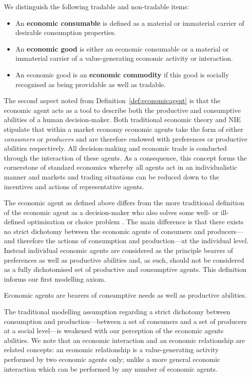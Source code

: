 \begin{definition} \label{economicgoods}
We distinguish the following tradable and non-tradable items:
\begin{itemize}
\item An \textbf{economic consumable} is defined as a material or immaterial carrier of desirable consumption properties.

\item An \textbf{economic good} is either an economic consumable or a material or immaterial carrier of a value-generating economic activity or interaction.

\item An economic good is an \textbf{economic commodity} if this good is socially recognised as being providable as well as tradable.
\end{itemize}
\end{definition}

The second aspect noted from Definition~\ref{def:economicagent} is that the economic agent acts as a tool to describe both the productive and consumptive abilities of a human decision-maker. Both traditional economic theory and NIE stipulate that within a market economy economic agents take the form of either \emph{consumers} or \emph{producers} and are therefore endowed with preferences or productive abilities respectively. All decision-making and economic trade is conducted through the interaction of these agents. As a consequence, this concept forms the cornerstone of standard economics whereby all agents act in an individualistic manner and markets and trading situations can be reduced down to the incentives and actions of representative agents.

The economic agent as defined above differs from the more traditional definition of the economic agent as a decision-maker who also solves some well- or ill-defined optimisation or choice problem \citep{MasColellWhinstonGreen1995}. The main difference is that there exists no strict dichotomy between the economic agents of consumers and producers---and therefore the actions of consumption and production---at the individual level. Instead individual economic agents are considered as the principle bearers of preferences as well as productive abilities and, as such, should not be considered as a fully dichotomised set of productive and consumptive agents. This definition informs our first modelling axiom.
\begin{axiom} \label{dichotomyhype}
Economic agents are bearers of consumptive needs as well as productive abilities.
\end{axiom}
The traditional modelling assumption regarding a strict dichotomy between consumption and production---between a set of consumers and a set of producers at a social level---is weakened with our perception of the economic agents abilities. We note that an economic interaction and an economic relationship are related concepts: an economic relationship is a value-generating activity performed by two economic agents only; unlike a more general economic interaction which can be performed by any number of economic agents.

